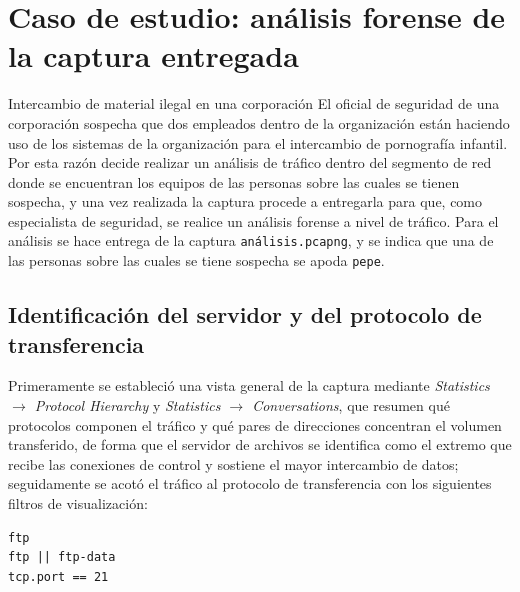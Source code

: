 \section{Caso de estudio: análisis forense de la captura entregada}

\begin{caso}{Intercambio de material ilegal en una corporación}
  El oficial de seguridad de una corporación sospecha que dos empleados dentro de la organización están haciendo uso de los sistemas de la organización para el intercambio de pornografía infantil. Por esta razón decide realizar un análisis de tráfico dentro del segmento de red donde se encuentran los equipos de las personas sobre las cuales se tienen sospecha, y una vez realizada la captura procede a entregarla para que, como especialista de seguridad, se realice un análisis forense a nivel de tráfico. Para el análisis se hace entrega de la captura \texttt{análisis.pcapng}, y se indica que una de las personas sobre las cuales se tiene sospecha se apoda \texttt{pepe}.
\end{caso}


\subsection{Identificación del servidor y del protocolo de transferencia}

Primeramente se estableció una vista general de la captura mediante \emph{Statistics $\rightarrow$ Protocol Hierarchy} y \emph{Statistics $\rightarrow$ Conversations}, que resumen qué protocolos componen el tráfico y qué pares de direcciones concentran el volumen transferido, de forma que el servidor de archivos se identifica como el extremo que recibe las conexiones de control y sostiene el mayor intercambio de datos; seguidamente se acotó el tráfico al protocolo de transferencia con los siguientes filtros de visualización:

\begin{lstlisting}
ftp
ftp || ftp-data
tcp.port == 21
\end{lstlisting}

